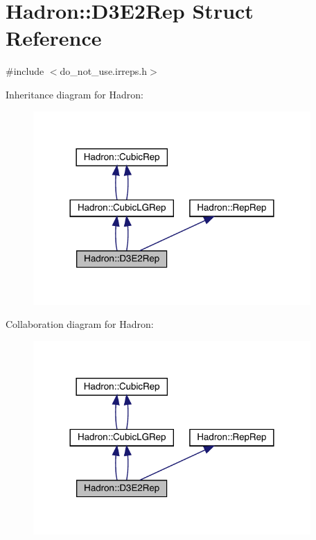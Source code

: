 \hypertarget{structHadron_1_1D3E2Rep}{}\section{Hadron\+:\+:D3\+E2\+Rep Struct Reference}
\label{structHadron_1_1D3E2Rep}


{\ttfamily \#include $<$do\+\_\+not\+\_\+use.\+irreps.\+h$>$}



Inheritance diagram for Hadron\+:\nopagebreak
\begin{figure}[H]
\begin{center}
\leavevmode
\includegraphics[width=300pt]{d9/d27/structHadron_1_1D3E2Rep__inherit__graph}
\end{center}
\end{figure}


Collaboration diagram for Hadron\+:\nopagebreak
\begin{figure}[H]
\begin{center}
\leavevmode
\includegraphics[width=300pt]{dd/d71/structHadron_1_1D3E2Rep__coll__graph}
\end{center}
\end{figure}
